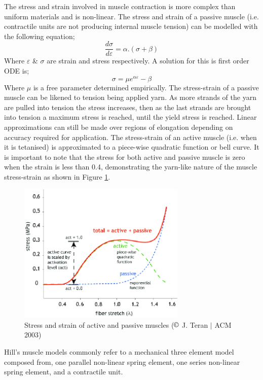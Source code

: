 The stress and strain involved in muscle contraction is more complex than uniform materials and is non-linear. The stress and strain of a passive muscle (i.e. contractile units are not producing internal muscle tension) can be modelled with the following equation; 
\begin{equation}
    \frac{d\sigma}{d\varepsilon} =  \alpha.(\sigma+\beta)
\end{equation}
Where $\varepsilon$ \& $\sigma$ are strain and stress respectively. A solution for this is first order ODE is; 
\begin{equation}
    \sigma = \mu e^{\alpha\varepsilon} - \beta
\end{equation}
Where $\mu$ is a free parameter determined empirically. The stress-strain of a passive muscle can be likened to tension being applied yarn. As more strands of the yarn are pulled into tension the stress increases, then as the last strands are brought into tension a maximum stress is reached, until the yield stress is reached. Linear approximations can still be made over regions of elongation depending on accuracy required for application. The stress-strain of an active muscle (i.e. when it is tetanised) is approximated to a piece-wise quadratic function or bell curve. It is important to note that the stress for both active and passive muscle is zero when the strain is less than 0.4, demonstrating the yarn-like nature of the muscle stress-strain as shown in Figure \ref{fig:muscle-fibre-stress}.
\begin{figure}[H]
  \centering
  \includegraphics[width=8cm]{Figures/Muscle-fiber-active-and-passive-behavior.png}
  \caption{Stress and strain of active and passive muscles ($\copyright$ J. Teran $|$ ACM 2003) \citep{Teran2003}}
  \label{fig:muscle-fibre-stress}
\end{figure}
Hill's muscle models commonly refer to a mechanical three element model \citep{Hill1938} composed from, one parallel non-linear spring element, one series non-linear spring element, and a contractile unit.
